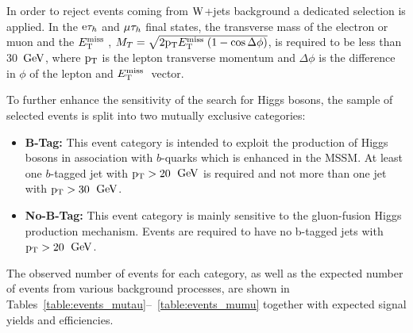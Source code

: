 In order to reject events coming from $\mathrm{W}$+jets background a dedicated selection is applied. 
In the $\mathrm{e}\mathrm{\tau}_h$ and $\mathrm{\mu}\mathrm{\tau}_h$ final states, the transverse mass of the electron 
or muon and the $E_\mathrm{T}^{\mathrm{miss}}\;$, $M_{T} = \sqrt{2 \mathrm{p_{T}} E_\mathrm{T}^{\mathrm{miss}}\; (1-\cos\Delta\phi)}$, is required to 
be less than 30~$\mathrm{GeV}$, where $\mathrm{p_{T}}$ is the lepton transverse momentum and $\Delta\phi$ is the difference in $\phi$ of the lepton and $E_\mathrm{T}^{\mathrm{miss}}\;$ vector. 



To further enhance the sensitivity of the search for Higgs bosons, the sample of selected events is split into
two mutually exclusive categories:
\begin{itemize}
\item {\bf B-Tag:} This event category is intended to exploit the production of Higgs bosons in association with $b$-quarks 
which is enhanced in the MSSM. At least one $b$-tagged jet with $\mathrm{p_{T}}>20$~$\mathrm{GeV}$ is required  and not more than one jet with $\mathrm{p_{T}}>30$~$\mathrm{GeV}$. 
\item {\bf No-B-Tag:} This event category is mainly sensitive to the gluon-fusion Higgs production mechanism. Events are required to have no b-tagged jets with $\mathrm{p_{T}}>20$~$\mathrm{GeV}$. 
\end{itemize}


The observed number of events for each category, as well as the expected number of events from various background processes, 
are shown in Tables~\ref{table:events_mutau}--~\ref{table:events_mumu} together with expected signal yields and efficiencies.


